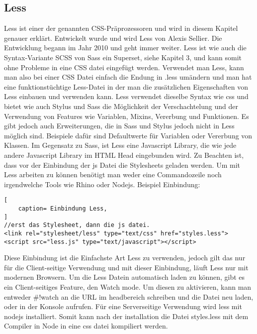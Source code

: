 \subsection{Less}
Less ist einer der genannten CSS-Präprozessoren und wird in diesem Kapitel genauer erklärt.\newline
Entwickelt wurde und wird Less von Alexis Sellier. Die Entwicklung begann im Jahr 2010 und geht immer weiter.\newline
Less ist wie auch die Syntax-Variante SCSS von Sass ein Superset, siehe Kapitel 3, und kann somit ohne Probleme in eine CSS datei eingefügt werden. Verwendet man Less, kann man also bei einer CSS Datei einfach die Endung in .less umändern und man hat eine funktionstüchtige Less-Datei in der man die zusätzlichen Eigenschaften von Less einbauen und verwenden kann. \newline
Less verwendet dieselbe Syntax wie css und bietet wie auch Stylus und Sass die Möglichkeit der Verschachtelung und der Verwendung von Features wie Variablen, Mixins, Vererbung und Funktionen.\newline
Es gibt jedoch auch Erweiterungen, die in Sass und Stylus jedoch nicht in Less möglich sind. Beispiele dafür sind Defaultwerte für Variablen oder Vererbung von Klassen.\newline
Im Gegensatz zu Sass, ist Less eine Javascript Library, die wie jede andere Javascript Library im HTML Head eingebunden wird. Zu Beachten ist, dass vor der Einbindung der js Datei die Stylesheets geladen werden. \newline
Um mit Less arbeiten zu können benötigt man weder eine Commandozeile noch irgendwelche Tools wie Rhino oder Nodejs.
Beispiel Einbindung:
\begin{lstlisting}[
	caption= Einbindung Less,
]
//erst das Stylesheet, dann die js datei.
<link rel="stylesheet/less" type="text/css" href="styles.less">
<script src="less.js" type="text/javascript"></script>    
\end{lstlisting}
Diese Einbindung ist die Einfachste Art Less zu verwenden, jedoch gilt das nur für die Client-seitige Verwendung und mit dieser Einbindung, läuft Less nur mit modernen Browsern.\newline
Um die Less Datein automatisch laden zu können, gibt es ein Client-seitiges Feature, den Watch mode. Um diesen zu aktivieren, kann man entweder \glqq\#!watch\grqq{} an die URL im headbereich schreiben und die Datei neu laden, oder in der Konsole \grqq{}   aufrufen.\newline
Für eine Serverseitige Verwendung wird less mit nodejs installiert. Somit kann nach der installation die Datei styles.less mit dem Compiler in Node in eine css datei kompiliert werden.\autocite[]{Sellier.2013}


